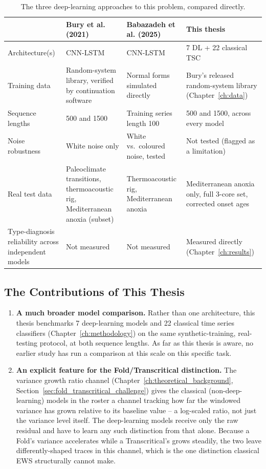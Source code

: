 \begin{table}[htbp]
\centering
\caption{The three deep-learning approaches to this problem, compared directly.}
\label{tab:related_work_comparison}
\begin{tabular}{p{2.4cm}p{3.4cm}p{3.4cm}p{3.6cm}}
\toprule
 & \textbf{Bury et al. (2021)} & \textbf{Babazadeh et al. (2025)} & \textbf{This thesis} \\
\midrule
Architecture(s) & CNN-LSTM & CNN-LSTM & 7 DL + 22 classical TSC \\
Training data & Random-system library, verified by continuation software & Normal forms simulated directly & Bury's released random-system library (Chapter~\ref{ch:data}) \\
Sequence lengths & 500 and 1500 & Training series length 100 & 500 and 1500, across every model \\
Noise robustness & White noise only & White vs.\ coloured noise, tested & Not tested (flagged as a limitation) \\
Real test data & Paleoclimate transitions, thermoacoustic rig, Mediterranean anoxia (subset) & Thermoacoustic rig, Mediterranean anoxia & Mediterranean anoxia only, full 3-core set, corrected onset ages \\
Type-diagnosis reliability across independent models & Not measured & Not measured & Measured directly (Chapter~\ref{ch:results}) \\
\bottomrule
\end{tabular}
\end{table}

\subsection{The Contributions of This Thesis}
\begin{enumerate}
    \item \textbf{A much broader model comparison.} Rather than one architecture, this thesis benchmarks 7 deep-learning models and 22 classical time series classifiers (Chapter~\ref{ch:methodology}) on the same synthetic-training, real-testing protocol, at both sequence lengths. As far as this thesis is aware, no earlier study has run a comparison at this scale on this specific task.
    \item \textbf{An explicit feature for the Fold/Transcritical distinction.} The variance growth ratio channel (Chapter~\ref{ch:theoretical_background}, Section~\ref{sec:fold_transcritical_challenge}) gives the classical (non-deep-learning) models in the roster a channel tracking how far the windowed variance has grown relative to its baseline value -- a log-scaled ratio, not just the variance level itself. The deep-learning models receive only the raw residual and have to learn any such distinction from that alone. Because a Fold's variance accelerates while a Transcritical's grows steadily, the two leave differently-shaped traces in this channel, which is the one distinction classical EWS structurally cannot make.
\end{enumerate}
